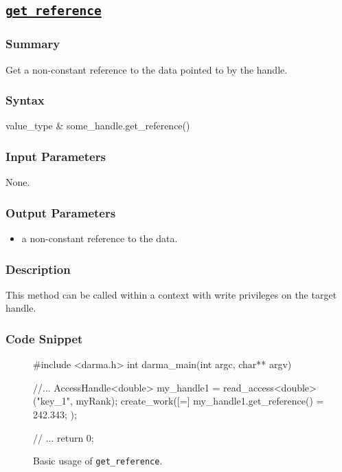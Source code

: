 \clearpage
\subsection{\underline{\texttt{get\_reference}}}

\hspace{0.1cm} %
\begin{subs}
\vspace{-1.2cm}

\subsubsection{Summary} 
Get a non-constant reference to the data pointed to by the handle.

\subsubsection{Syntax} 
\begin{CppCode}
value_type & some_handle.get_reference()
\end{CppCode}

\subsubsection{Input Parameters} 
None.

\subsubsection{Output Parameters} 
\begin{itemize}
\item a non-constant reference to the data.  
\end{itemize}

\subsubsection{Description} 
This method can be called within a context with write privileges 
on the target handle.


\subsubsection{Code Snippet} 
\begin{figure}[!h]
\begin{CppCodeNumb}
#include <darma.h>
int darma_main(int argc, char** argv)
{
	//...
  AccessHandle<double> my_handle1 = read_access<double>("key_1", myRank);
  create_work([=]{
  	my_handle1.get_reference() = 242.343;
  });

  // ... 
  return 0;
}
\end{CppCodeNumb}
\label{fig:fe_api_initialaccess}
\caption{Basic usage of \texttt{get\_reference}.}
\end{figure}

\end{subs}




